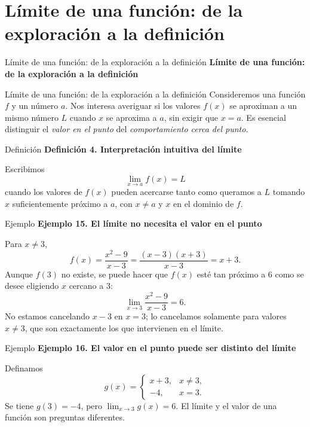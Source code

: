 \documentclass[12pt,aspectratio=169]{beamer}
\begin{document}
\section{Límite de una función: de la exploración a la definición}

\begin{frame}[t]{Límite de una función: de la exploración a la definición}
\centering\vfill{\Large\bfseries\color{azul} Límite de una función: de la exploración a la definición}\vfill
\end{frame}


\begin{frame}[t,allowframebreaks]{Límite de una función: de la exploración a la definición}
Consideremos una función $f$ y un número $a$. Nos interesa averiguar si los valores $f(x)$ se aproximan a un mismo número $L$ cuando $x$ se aproxima a $a$, sin exigir que $x=a$. Es esencial distinguir el \emph{valor en el punto} del \emph{comportamiento cerca del punto}.
\end{frame}


\begin{frame}[t,allowframebreaks]{Definición}
{\color{azul}\bfseries Definición 4. Interpretación intuitiva del límite}\par\medskip

Escribimos
\[
 \lim_{x\to a}f(x)=L
\]
cuando los valores de $f(x)$ pueden acercarse tanto como queramos a $L$ tomando $x$ suficientemente próximo a $a$, con $x\ne a$ y $x$ en el dominio de $f$.
\end{frame}


\begin{frame}[t,allowframebreaks]{Ejemplo}
{\color{azul}\bfseries Ejemplo 15. El límite no necesita el valor en el punto}\par\medskip

Para $x\ne3$,
\[
 f(x)=\frac{x^2-9}{x-3}=\frac{(x-3)(x+3)}{x-3}=x+3.
\]
Aunque $f(3)$ no existe, se puede hacer que $f(x)$ esté tan próximo a $6$ como se desee eligiendo $x$ cercano a $3$:
\[
 \boxed{\lim_{x\to3}\frac{x^2-9}{x-3}=6.}
\]
No estamos cancelando $x-3$ en $x=3$; lo cancelamos solamente para valores $x\ne3$, que son exactamente los que intervienen en el límite.
\end{frame}


\begin{frame}[t,allowframebreaks]{Ejemplo}
{\color{azul}\bfseries Ejemplo 16. El valor en el punto puede ser distinto del límite}\par\medskip

Definamos
\[
 g(x)=\begin{cases}x+3,&x\ne3,\\-4,&x=3.\end{cases}
\]
Se tiene $g(3)=-4$, pero $\lim_{x\to3}g(x)=6$. El límite y el valor de una función son preguntas diferentes.
\end{frame}
\end{document}
